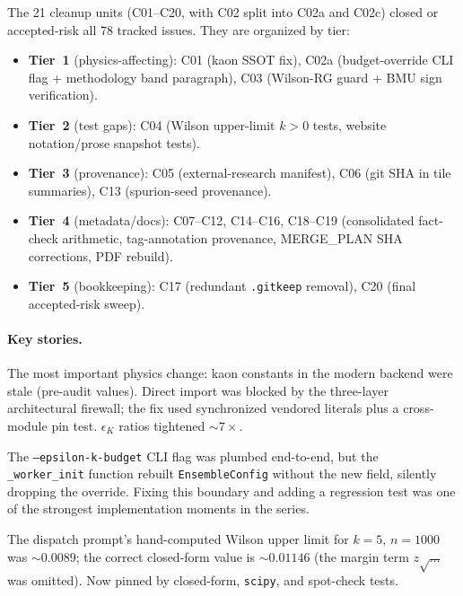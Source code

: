 \documentclass[11pt]{article}
\newcommand{\eK}{\epsilon_K}
\begin{document}
The 21 cleanup units (C01--C20, with C02 split into C02a and C02c)
closed or accepted-risk all 78 tracked issues.  They are organized by
tier:
\begin{itemize}[nosep]
  \item \textbf{Tier~1} (physics-affecting): C01 (kaon SSOT fix),
    C02a (budget-override CLI flag + methodology band paragraph),
    C03 (Wilson-RG guard + BMU sign verification).
  \item \textbf{Tier~2} (test gaps): C04 (Wilson upper-limit $k>0$
    tests, website notation/prose snapshot tests).
  \item \textbf{Tier~3} (provenance): C05 (external-research
    manifest), C06 (git SHA in tile summaries), C13 (spurion-seed
    provenance).
  \item \textbf{Tier~4} (metadata/docs): C07--C12, C14--C16, C18--C19
    (consolidated fact-check arithmetic, tag-annotation provenance,
    MERGE\_PLAN SHA corrections, PDF rebuild).
  \item \textbf{Tier~5} (bookkeeping): C17 (redundant
    \texttt{.gitkeep} removal), C20 (final accepted-risk sweep).
\end{itemize}

\paragraph{Key stories.}

\begin{description}[style=nextline,font=\normalfont\bfseries]
\item[C01 --- Firewall discovery.]
The most important physics change: kaon constants in the modern
backend were stale (pre-audit values).  Direct import was blocked by
the three-layer architectural firewall; the fix used synchronized
vendored literals plus a cross-module pin test.  $\eK$ ratios
tightened $\sim\!7\times$.

\item[C02a --- Worker-init bug.]
The \texttt{--epsilon-k-budget} CLI flag was plumbed end-to-end, but
the \texttt{\_worker\_init} function rebuilt \texttt{EnsembleConfig}
without the new field, silently dropping the override.  Fixing this
boundary and adding a regression test was one of the strongest
implementation moments in the series.

\item[C04 --- Hand-computation correction.]
The dispatch prompt's hand-computed Wilson upper limit for $k=5$,
$n=1000$ was $\sim\!0.0089$; the correct closed-form value is
$\sim\!0.01146$ (the margin term $z\sqrt{\ldots}$ was omitted).
Now pinned by closed-form, \texttt{scipy}, and spot-check tests.
\end{description}
\end{document}
